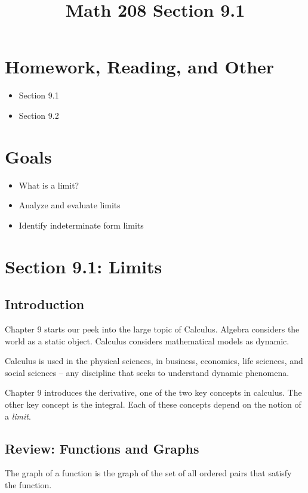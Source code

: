 \documentclass[14pt]{extarticle}
\title{\vspace{-5ex}Math 208 Section 9.1}
\date{\vspace{-10ex}}
\begin{document}
	\maketitle		
	\section*{Homework, Reading, and Other}
	\begin{itemize}
		\item Section 9.1
		\item Section 9.2
	\end{itemize}

	\section{Goals}
	\begin{itemize}
		\item What is a limit?
		\item Analyze and evaluate limits
		\item Identify indeterminate form limits
	\end{itemize}
		
\section{Section 9.1: Limits}
\subsection{Introduction}
Chapter 9 starts our peek into the large topic of Calculus. Algebra considers the world as a static object. Calculus considers mathematical models as dynamic.

Calculus is used in the physical sciences, in business, economics, life sciences, and social sciences -- any discipline that seeks to understand dynamic phenomena.

Chapter 9 introduces the derivative, one of the two key concepts in calculus. The other key concept is the integral. Each of these concepts depend on the notion of a \textit{limit}.

\subsection{Review: Functions and Graphs}
The graph of a function is the graph of the set of all ordered pairs that satisfy the function.
\end{document}
